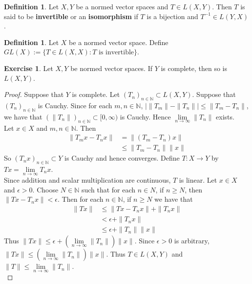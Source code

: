 \documentclass[12pt]{amsart}
\theoremstyle{definition}
\newtheorem{defn}[definition]{Definition}
\newtheorem{ex}[definition]{Exercise}
\newcommand{\ep}{\epsilon}
\newcommand{\N}{\mathbb{N}}
\newcommand{\Rg}{[0,\infty)}
\newcommand{\limn}{\lim \limits_{n \rightarrow \infty}}
\newcommand{\lex}[1]{\label{ex:#1}}
\newcommand{\ld}[1]{\label{defn:#1}}
\begin{document}
	\begin{defn} \ld{42010}
		Let $X,Y$ be a normed vector spaces and $T \in L(X,Y)$. Then $T$ is said to be \textbf{invertible} or an \textbf{isomorphism} if $T$ is a bijection and $T^{-1} \in L(Y,X)$.
	\end{defn}
	
	\begin{defn} \ld{42011}
		Let $X$ be a normed vector space. Define $GL(X) := \{T \in L(X,X): T \text{ is invertible}\}$.
	\end{defn}
	
	\begin{ex} \lex{42013}
		Let $X,Y$ be normed vector spaces. If $Y$ is complete, then so is $L(X,Y)$.
	\end{ex}
	
	\begin{proof}
		Suppose that $Y$ is complete. Let $(T_n)_{n \in \N} \subset L(X,Y)$. Suppose that $(T_n)_{n \in \N}$ is Cauchy. Since for each $m,n \in \N$, $\big\vert \|T_m \|- \|T_n \|\big\vert \leq \|T_m -T_n \|$, we have that $(\|T_n \|)_{n \in \N} \subset \Rg$ is Cauchy. Hence $\lim\limits_{n \rightarrow \infty}\|T_n \|$ exists. \vspace{1cm} \\ Let $x \in X$ and $m,n \in \N$. Then 
		\begin{align*}
			\|T_m x - T_n x \|
			&= \|(T_m-T_n) x \|\\
			&\leq \|T_m-T_n \|\|x \|
		\end{align*}
		So $(T_nx)_{n \in \N} \subset Y$ is Cauchy and hence converges. Define $T:X \rightarrow Y$ by $Tx = \lim\limits_{n \rightarrow \infty} T_nx$. \vspace{1cm}\\
		Since addition and scalar multiplication are continuous, $T$ is linear. Let $x \in X$ and $\ep>0$. Choose $N \in \N$ such that for each $n \in N$, if $n \geq N$, then $\|Tx - T_n x\|< \ep$. Then for each $n \in \N$, if $n \geq N$ we have that 
		\begin{align*}
			\|Tx\|
			&\leq \|Tx-T_nx \|+ \|T_nx \|\\
			&< \ep + \|T_nx \|\\
			&\leq \ep + \|T_n \|\|x \|
		\end{align*}  
		Thus $\|Tx \|\leq \ep +(\lim\limits_{n \rightarrow \infty} \|T_n \|) \|x \|$. Since $\ep >0$ is arbitrary, $\|Tx \|\leq (\lim\limits_{n \rightarrow \infty} \|T_n \|) \|x \|$. Thus $T \in L(X,Y)$ and $\|T \|\leq \limn \|T_n \|$. \vspace{1cm} \\

\end{proof}
\end{document}
